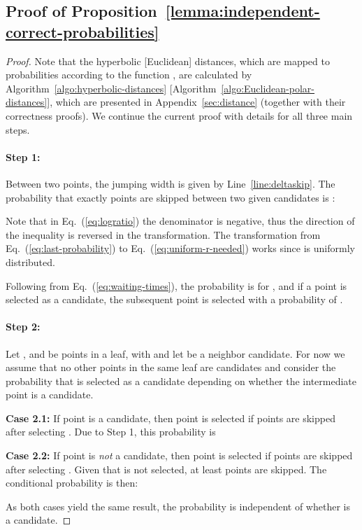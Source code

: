 \documentclass{llncs}
\begin{document}
\subsection{Proof of Proposition~\ref{lemma:independent-correct-probabilities}}
\label{sub:proof-lemma-indep}
\begin{proof}
Note that the hyperbolic [Euclidean] distances, which are mapped to probabilities according to the function ,
are calculated by Algorithm~\ref{algo:hyperbolic-distances}
[Algorithm~\ref{algo:Euclidean-polar-distances}], which are presented in Appendix~\ref{sec:distance} (together with their correctness proofs).
We continue the current proof with details for all three main steps.
\paragraph{Step 1:}
Between two points, the jumping width  is given by Line~\ref{line:deltaskip}.
The probability that exactly  points are skipped between two given candidates is :

Note that in Eq.~(\ref{eq:logratio}) the denominator is negative, thus the direction of the inequality is reversed in the transformation.
The transformation from Eq.~(\ref{eq:last-probability}) to Eq.~(\ref{eq:uniform-r-needed}) works since  is uniformly distributed.

Following from Eq.~(\ref{eq:waiting-times}), the probability is  for , and if a point is selected as a candidate, the subsequent point is selected with a probability of .

\paragraph{Step 2:}
Let ,  and  be points in a leaf, with  and let  be a neighbor candidate.
For now we assume that no other points in the same leaf are candidates and consider the probability that  is selected as a candidate depending on whether the intermediate point  is a candidate.

\textbf{Case 2.1:} If point  is a candidate, then point  is selected if  points are skipped after selecting .
Due to Step 1, this probability is 

\textbf{Case 2.2:} If point  is \emph{not} a candidate, then point  is selected if  points are skipped after selecting .
Given that  is not selected, at least  points are skipped.
The conditional probability is then:

As both cases yield the same result, the probability  is independent of whether  is a candidate.


\end{proof}
\end{document}
